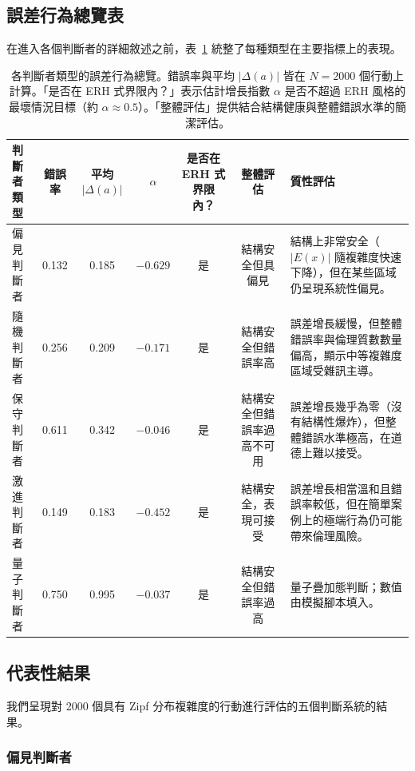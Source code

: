 \documentclass[12pt,a4paper]{article}
\theoremstyle{definition}
\theoremstyle{remark}
\begin{document}
\subsection{誤差行為總覽表}

在進入各個判斷者的詳細敘述之前，表~\ref{tab:summary_judges_zh} 統整了每種類型在主要指標上的表現。

\begin{table}[htbp]
\centering
\caption{各判斷者類型的誤差行為總覽。錯誤率與平均 $|\Delta(a)|$ 皆在 $N = 2000$ 個行動上計算。「是否在 ERH 式界限內？」表示估計增長指數 $\alpha$ 是否不超過 ERH 風格的最壞情況目標（約 $\alpha \approx 0.5$）。「整體評估」提供結合結構健康與整體錯誤水準的簡潔評估。}
\label{tab:summary_judges_zh}
\begin{tabular}{lcccccp{5cm}}
\toprule
\textbf{判斷者類型} & \textbf{錯誤率} & \textbf{平均 $|\Delta(a)|$} & \textbf{$\alpha$} & \textbf{是否在 ERH 式界限內？} & \textbf{整體評估} & \textbf{質性評估} \\
\midrule
偏見判斷者       & 0.132 & 0.185 & $-0.629$ & 是 & 結構安全但具偏見 & 結構上非常安全（$|E(x)|$ 隨複雜度快速下降），但在某些區域仍呈現系統性偏見。 \\
隨機判斷者       & 0.256 & 0.209 & $-0.171$ & 是 & 結構安全但錯誤率高 & 誤差增長緩慢，但整體錯誤率與倫理質數數量偏高，顯示中等複雜度區域受雜訊主導。 \\
保守判斷者       & 0.611 & 0.342 & $-0.046$ & 是 & 結構安全但錯誤率過高不可用 & 誤差增長幾乎為零（沒有結構性爆炸），但整體錯誤水準極高，在道德上難以接受。 \\
激進判斷者       & 0.149 & 0.183 & $-0.452$ & 是 & 結構安全，表現可接受 & 誤差增長相當溫和且錯誤率較低，但在簡單案例上的極端行為仍可能帶來倫理風險。 \\
量子判斷者       & 0.750 & 0.995 & $-0.037$ & 是 & 結構安全但錯誤率過高 & 量子疊加態判斷；數值由模擬腳本填入。 \\
\bottomrule
\end{tabular}
\end{table}

\subsection{代表性結果}

我們呈現對 2000 個具有 Zipf 分布複雜度的行動進行評估的五個判斷系統的結果。

\subsubsection{偏見判斷者}
\end{document}
